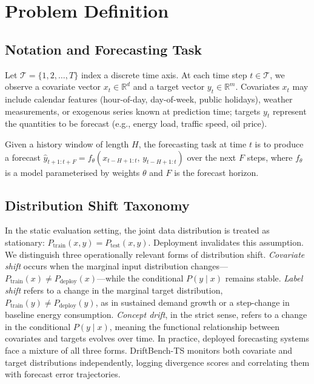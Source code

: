 \documentclass[conference]{IEEEtran}
\begin{document}
\section{Problem Definition}

\subsection{Notation and Forecasting Task}

Let $\mathcal{T} = \{1, 2, \ldots, T\}$ index a discrete time axis.
At each time step $t \in \mathcal{T}$, we observe a covariate vector
$x_t \in \mathbb{R}^{d}$ and a target vector $y_t \in \mathbb{R}^{m}$.
Covariates $x_t$ may include calendar features (hour-of-day,
day-of-week, public holidays), weather measurements, or exogenous
series known at prediction time; targets $y_t$ represent the
quantities to be forecast (e.g., energy load, traffic speed, oil
price).

Given a history window of length $H$, the forecasting task at time
$t$ is to produce a forecast
$\hat{y}_{t+1:t+F} = f_\theta(x_{t-H+1:t},\, y_{t-H+1:t})$
over the next $F$ steps, where $f_\theta$ is a model parameterised
by weights $\theta$ and $F$ is the forecast horizon.

\subsection{Distribution Shift Taxonomy}

In the static evaluation setting, the joint data distribution is
treated as stationary: $P_{\text{train}}(x, y) =
	P_{\text{test}}(x, y)$. Deployment invalidates this assumption.
We distinguish three operationally relevant forms of distribution
shift. \textit{Covariate shift} occurs when the marginal input
distribution changes---$P_{\text{train}}(x) \neq
	P_{\text{deploy}}(x)$---while the conditional $P(y \mid x)$ remains
stable. \textit{Label shift} refers to a change in the marginal
target distribution, $P_{\text{train}}(y) \neq P_{\text{deploy}}(y)$,
as in sustained demand growth or a step-change in baseline energy
consumption. \textit{Concept drift}, in the strict sense, refers to
a change in the conditional $P(y \mid x)$, meaning the functional
relationship between covariates and targets evolves over time.
In practice, deployed forecasting systems face a mixture of all three
forms. DriftBench-TS monitors both covariate and target distributions
independently, logging divergence scores and correlating them with
forecast error trajectories.
\end{document}
